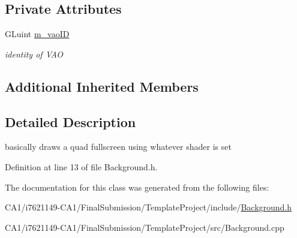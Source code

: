 \subsection*{Private Attributes}
\begin{DoxyCompactItemize}
\item 
\hypertarget{class_background_a0a7b6b8f195c0e733a3fb8334137d32f}{G\-Luint \hyperlink{class_background_a0a7b6b8f195c0e733a3fb8334137d32f}{m\-\_\-vao\-I\-D}}\label{class_background_a0a7b6b8f195c0e733a3fb8334137d32f}

\begin{DoxyCompactList}\small\item\em identity of V\-A\-O \end{DoxyCompactList}\end{DoxyCompactItemize}
\subsection*{Additional Inherited Members}


\subsection{Detailed Description}
basically draws a quad fullscreen using whatever shader is set 

Definition at line 13 of file Background.\-h.



The documentation for this class was generated from the following files\-:\begin{DoxyCompactItemize}
\item 
C\-A1/i7621149-\/\-C\-A1/\-Final\-Submission/\-Template\-Project/include/\hyperlink{_background_8h}{Background.\-h}\item 
C\-A1/i7621149-\/\-C\-A1/\-Final\-Submission/\-Template\-Project/src/Background.\-cpp\end{DoxyCompactItemize}
